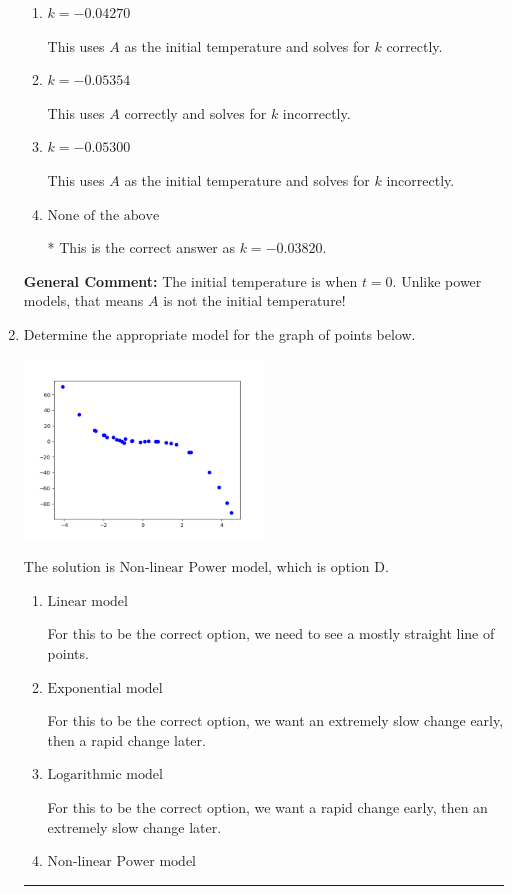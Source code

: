 \documentclass{extbook}[14pt]
\newcommand{\litem}[1]{\item #1

\rule{\textwidth}{0.4pt}}
\begin{document}
\begin{enumerate}
{\begin{enumerate}[label=\Alph*.]
This uses $A$ as the bath temperature and solves for $k$ incorrectly.
\item \( k = -0.04270 \)

This uses $A$ as the initial temperature and solves for $k$ correctly.
\item \( k = -0.05354 \)

This uses $A$ correctly and solves for $k$ incorrectly.
\item \( k = -0.05300 \)

This uses $A$ as the initial temperature and solves for $k$ incorrectly.
\item \( \text{None of the above} \)

* This is the correct answer as $k = -0.03820$.
\end{enumerate}

\textbf{General Comment:} The initial temperature is when $t = 0$. Unlike power models, that means $A$ is not the initial temperature!
}
\litem{
Determine the appropriate model for the graph of points below.

\begin{center}
    \includegraphics[width=0.5\textwidth]{../Figures/identifyModelGraph11C.png}
\end{center}


The solution is \( \text{Non-linear Power model} \), which is option D.\begin{enumerate}[label=\Alph*.]
\item \( \text{Linear model} \)

For this to be the correct option, we need to see a mostly straight line of points.
\item \( \text{Exponential model} \)

For this to be the correct option, we want an extremely slow change early, then a rapid change later.
\item \( \text{Logarithmic model} \)

For this to be the correct option, we want a rapid change early, then an extremely slow change later.
\item \( \text{Non-linear Power model} \)


\end{enumerate}}
\end{enumerate}
\end{document}
